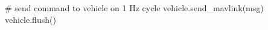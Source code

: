 \begin{apendicesenv}
\begin{python_}
	# send command to vehicle on 1 Hz cycle
	vehicle.send_mavlink(msg)
	vehicle.flush()
\end{python_}

\end{apendicesenv}
